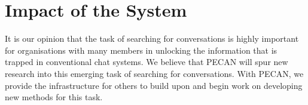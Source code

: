 \vspace{-8pt}
\section{Impact of the System}

It is our opinion that the task of searching for conversations is highly important for organisations with many members in unlocking the information that is trapped in conventional chat systems. We believe that PECAN will spur new research into this emerging task of searching for conversations. With PECAN, we provide the infrastructure for others to build upon and begin work on developing new methods for this task. 